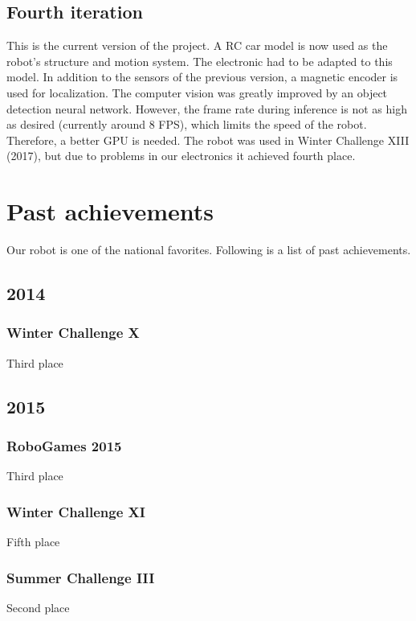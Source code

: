 \documentclass[conference]{IEEEtran}
\begin{document}
\subsection{Fourth iteration}
This is the current version of the project. A RC car model is now used as the robot's
structure and motion system. The electronic had to be adapted to this model.
In addition to the sensors of the previous version, a magnetic encoder is used for
localization. The computer vision was greatly improved by an object detection neural network.
However, the frame rate during inference is not as high as desired (currently around 8 FPS), which
limits the speed of the robot. Therefore, a better GPU is needed.
The robot was used in Winter Challenge XIII (2017), but due to problems in our electronics
it achieved fourth place.
\section{Past achievements} \label{past-achievements}
Our robot is one of the national favorites. Following is a list of past achievements.


\subsection*{2014}
\setcounter{subsubsection}{0}
\subsubsection{Winter Challenge X} Third place
\subsection*{2015}
\setcounter{subsubsection}{0}
\subsubsection{RoboGames 2015} Third place
\subsubsection{Winter Challenge XI} Fifth place
\subsubsection{Summer Challenge III} Second place
\end{document}
